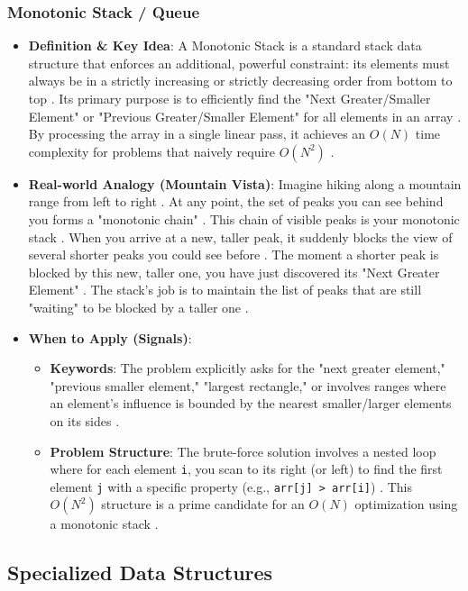 \documentclass{article}
\begin{document}
\subsubsection{Monotonic Stack / Queue}
\begin{itemize}
\item \textbf{Definition \& Key Idea}: A Monotonic Stack is a standard stack data structure that enforces an additional, powerful constraint: its elements must always be in a strictly increasing or strictly decreasing order from bottom to top \cite{196}. Its primary purpose is to efficiently find the "Next Greater/Smaller Element" or "Previous Greater/Smaller Element" for all elements in an array \cite{197}. By processing the array in a single linear pass, it achieves an $O(N)$ time complexity for problems that naively require $O(N^2)$ \cite{198, 199}.
\item \textbf{Real-world Analogy (Mountain Vista)}: Imagine hiking along a mountain range from left to right \cite{200}. At any point, the set of peaks you can see behind you forms a "monotonic chain" \cite{201}. This chain of visible peaks is your monotonic stack \cite{202}. When you arrive at a new, taller peak, it suddenly blocks the view of several shorter peaks you could see before \cite{203}. The moment a shorter peak is blocked by this new, taller one, you have just discovered its "Next Greater Element" \cite{203}. The stack's job is to maintain the list of peaks that are still "waiting" to be blocked by a taller one \cite{204}.
\item \textbf{When to Apply (Signals)}:
\begin{itemize}
\item \textbf{Keywords}: The problem explicitly asks for the "next greater element," "previous smaller element," "largest rectangle," or involves ranges where an element's influence is bounded by the nearest smaller/larger elements on its sides \cite{206}.
\item \textbf{Problem Structure}: The brute-force solution involves a nested loop where for each element \texttt{i}, you scan to its right (or left) to find the first element \texttt{j} with a specific property (e.g., \texttt{arr[j] > arr[i]}) \cite{208}. This $O(N^2)$ structure is a prime candidate for an $O(N)$ optimization using a monotonic stack \cite{209}.
\end{itemize}
\end{itemize}

\subsection{Specialized Data Structures}
\end{document}
